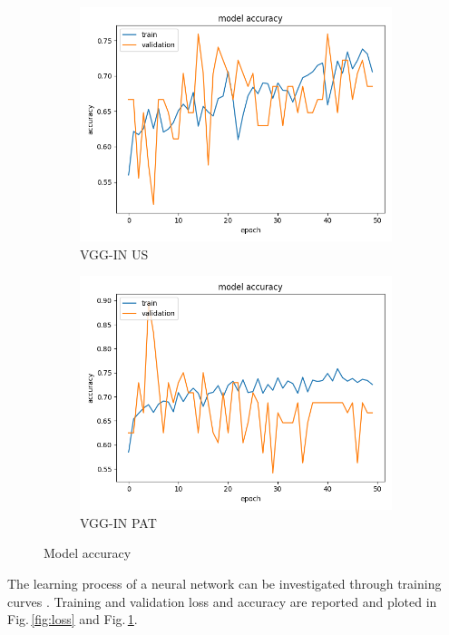 \begin{figure}
\begin{subfigure}[b]{.45\linewidth}
\includegraphics[width=\linewidth]{Figs/vgg_in_us_acc.jpg}
\caption{VGG-IN US}
\end{subfigure}
\begin{subfigure}[b]{.45\linewidth}
\includegraphics[width=\linewidth]{Figs/vgg_in_pat_acc.jpg}
\caption{VGG-IN PAT}
\end{subfigure}
\caption{Model accuracy}
\label{fig:acc}
\end{figure}

The learning process of a neural network can be investigated through training curves \citep{Anzanello2011}. Training and validation loss and accuracy are reported and ploted in Fig.\,\ref{fig:loss} and Fig.\,\ref{fig:acc}. 


